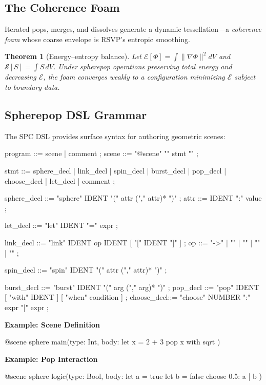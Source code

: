 \documentclass[12pt]{article}
\newtheorem{theorem}{Theorem}
\begin{document}
\subsection{The Coherence Foam}
Iterated pops, merges, and dissolves generate a dynamic tessellation---a \emph{coherence foam} whose coarse envelope is RSVP's entropic smoothing.

\begin{theorem}[Energy--entropy balance]
Let \(\mathcal{E}[\Phi]=\int \|\nabla \Phi\|^2 dV\) and \(\mathcal{S}[S]=\int S\,dV\). Under spherepop operations preserving total energy and decreasing \(\mathcal{E}\), the foam converges weakly to a configuration minimizing \(\mathcal{E}\) subject to boundary data.
\end{theorem}

\subsection{Spherepop DSL Grammar}
The SPC DSL provides surface syntax for authoring geometric scenes:

\begin{codeblock}
program   ::= { scene | comment } ;
scene     ::= "@scene" "{" { stmt } "}" ;

stmt      ::= sphere_decl | link_decl | spin_decl
           | burst_decl | pop_decl | choose_decl | let_decl
           | comment ;

sphere_decl ::= "sphere" IDENT "(" { attr ("," attr)* } ")" ;
attr      ::= IDENT ":" value ;

let_decl  ::= "let" IDENT "=" expr ;

link_decl ::= "link" IDENT op IDENT [ "[" IDENT "]" ] ;
op        ::= "->" | "\nabla" | "\otimes" | "\oplus" | "\circ" ;

spin_decl ::= "spin" IDENT "(" { attr ("," attr)* } ")" ;

burst_decl ::= "burst" IDENT "(" { arg ("," arg)* } ")" ;
pop_decl   ::= "pop" IDENT [ "with" IDENT ] [ "when" condition ] ;
choose_decl::= "choose" NUMBER ":" expr "|" expr ;
\end{codeblock}

\textbf{Example: Scene Definition}
\begin{codeblock}
@scene {
    sphere main(type: Int, body: {
        let x = 2 + 3
        pop x with sqrt
    })
}
\end{codeblock}

\textbf{Example: Pop Interaction}
\begin{codeblock}
@scene {
    sphere logic(type: Bool, body: {
        let a = true
        let b = false
        choose 0.5: a | b
    })
}
\end{codeblock}
\end{document}
